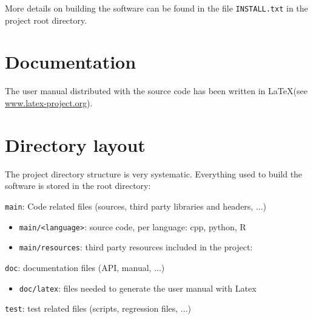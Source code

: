More details on building the software can be found in the file \texttt{INSTALL.txt} in the project root directory.


%
\section{Documentation}
\label{section:documentation}


The user manual distributed with the source code has been written in \LaTeX (see \url{www.latex-project.org}).



%
\section{Directory layout}

The project directory structure is very systematic.
Everything used to build the software is stored in the root directory:
\begin{compactitem}
    \item \texttt{main}: Code related files (sources, third party libraries and headers, ...)
      	\begin{itemize}
        		\item \texttt{main/<language>}: source code, per language: cpp, python, R
        		\item \texttt{main/resources}: third party resources included in the project:
        \end{itemize}
    \item \texttt{doc}: documentation files (API, manual, ...)
      	\begin{itemize}
        		\item \texttt{doc/latex}: files needed to generate the user manual with Latex
        \end{itemize}
    \item \texttt{test}: test related files (scripts, regression files, ...)
\end{compactitem}

